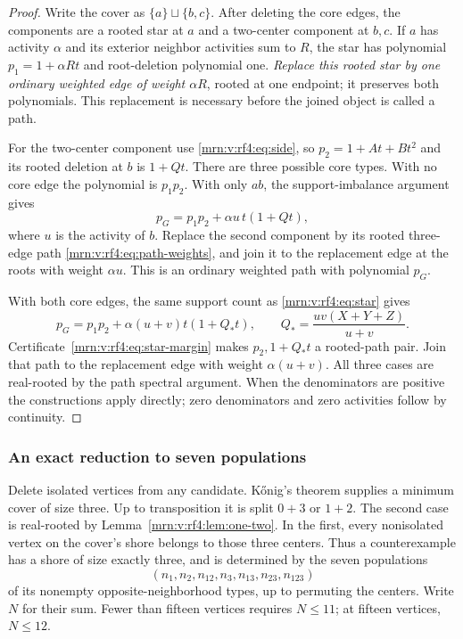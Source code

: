 \documentclass[11pt,a4paper]{article}
\theoremstyle{remark}\newtheorem{remark}[theorem]{Remark}
\begin{document}
\begin{proof}
Write the cover as $\{a\}\sqcup\{b,c\}$. After deleting the core edges, the components are a rooted star at $a$ and a two-center component at $b,c$. If $a$ has activity $\alpha$ and its exterior neighbor activities sum to $R$, the star has polynomial $p_1=1+\alpha Rt$ and root-deletion polynomial one. \emph{Replace this rooted star by one ordinary weighted edge of weight $\alpha R$}, rooted at one endpoint; it preserves both polynomials. This replacement is necessary before the joined object is called a path.

For the two-center component use \eqref{mrn:v:rf4:eq:side}, so $p_2=1+At+Bt^2$ and its rooted deletion at $b$ is $1+Qt$. There are three possible core types. With no core edge the polynomial is $p_1p_2$. With only $ab$, the support-imbalance argument gives
\[
p_G=p_1p_2+\alpha u\,t(1+Qt),
\]
where $u$ is the activity of $b$. Replace the second component by its rooted three-edge path \eqref{mrn:v:rf4:eq:path-weights}, and join it to the replacement edge at the roots with weight $\alpha u$. This is an ordinary weighted path with polynomial $p_G$.

With both core edges, the same support count as \eqref{mrn:v:rf4:eq:star} gives
\[
p_G=p_1p_2+\alpha(u+v)t(1+Q_*t),
\qquad Q_* =\frac{uv(X+Y+Z)}{u+v}.
\]
Certificate~\eqref{mrn:v:rf4:eq:star-margin} makes $p_2,1+Q_*t$ a rooted-path pair. Join that path to the replacement edge with weight $\alpha(u+v)$. All three cases are real-rooted by the path spectral argument. When the denominators are positive the constructions apply directly; zero denominators and zero activities follow by continuity.
\end{proof}

\subsubsection{An exact reduction to seven populations}
Delete isolated vertices from any candidate. K\H{o}nig's theorem supplies a minimum cover of size three. Up to transposition it is split $0+3$ or $1+2$. The second case is real-rooted by Lemma~\ref{mrn:v:rf4:lem:one-two}. In the first, every nonisolated vertex on the cover's shore belongs to those three centers. Thus a counterexample has a shore of size exactly three, and is determined by the seven populations
\[
(n_1,n_2,n_{12},n_3,n_{13},n_{23},n_{123})
\]
of its nonempty opposite-neighborhood types, up to permuting the centers. Write $N$ for their sum. Fewer than fifteen vertices requires $N\le11$; at fifteen vertices, $N\le12$.
\end{document}
